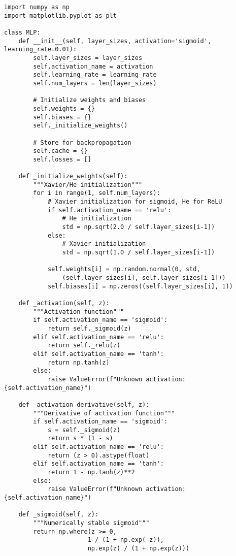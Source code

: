 ﻿\documentclass[12pt,a4paper]{article}
\begin{document}
\begin{lstlisting}
import numpy as np
import matplotlib.pyplot as plt

class MLP:
    def __init__(self, layer_sizes, activation='sigmoid', learning_rate=0.01):
        self.layer_sizes = layer_sizes
        self.activation_name = activation
        self.learning_rate = learning_rate
        self.num_layers = len(layer_sizes)
        
        # Initialize weights and biases
        self.weights = {}
        self.biases = {}
        self._initialize_weights()
        
        # Store for backpropagation
        self.cache = {}
        self.losses = []
    
    def _initialize_weights(self):
        """Xavier/He initialization"""
        for i in range(1, self.num_layers):
            # Xavier initialization for sigmoid, He for ReLU
            if self.activation_name == 'relu':
                # He initialization
                std = np.sqrt(2.0 / self.layer_sizes[i-1])
            else:
                # Xavier initialization
                std = np.sqrt(1.0 / self.layer_sizes[i-1])
            
            self.weights[i] = np.random.normal(0, std, 
                (self.layer_sizes[i], self.layer_sizes[i-1]))
            self.biases[i] = np.zeros((self.layer_sizes[i], 1))
    
    def _activation(self, z):
        """Activation function"""
        if self.activation_name == 'sigmoid':
            return self._sigmoid(z)
        elif self.activation_name == 'relu':
            return self._relu(z)
        elif self.activation_name == 'tanh':
            return np.tanh(z)
        else:
            raise ValueError(f"Unknown activation: {self.activation_name}")
    
    def _activation_derivative(self, z):
        """Derivative of activation function"""
        if self.activation_name == 'sigmoid':
            s = self._sigmoid(z)
            return s * (1 - s)
        elif self.activation_name == 'relu':
            return (z > 0).astype(float)
        elif self.activation_name == 'tanh':
            return 1 - np.tanh(z)**2
        else:
            raise ValueError(f"Unknown activation: {self.activation_name}")
    
    def _sigmoid(self, z):
        """Numerically stable sigmoid"""
        return np.where(z >= 0,
                       1 / (1 + np.exp(-z)),
                       np.exp(z) / (1 + np.exp(z)))
    

\end{lstlisting}
\end{document}
